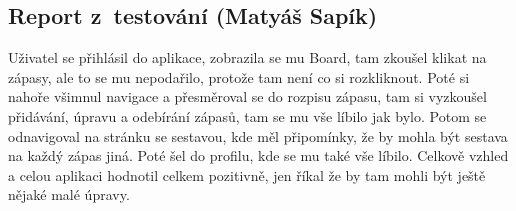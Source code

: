 \documentclass[a4paper, 11pt]{article}
\begin{document}
\subsection{Report z~testování (Matyáš Sapík)}

Uživatel se přihlásil do aplikace, zobrazila se mu Board, tam zkoušel klikat na zápasy, ale to se mu nepodařilo, protože tam není co si rozkliknout. Poté si nahoře všimnul navigace a přesměroval se do rozpisu zápasu, tam si vyzkoušel přidávání, úpravu a odebírání zápasů, tam se mu vše líbilo jak bylo. Potom se odnavigoval na stránku se sestavou, kde měl připomínky, že by mohla být sestava na každý zápas jiná. Poté šel do profilu, kde se mu také vše líbilo. Celkově vzhled a celou aplikaci hodnotil celkem pozitivně, jen říkal že by tam mohli být ještě nějaké malé úpravy.
\end{document}
